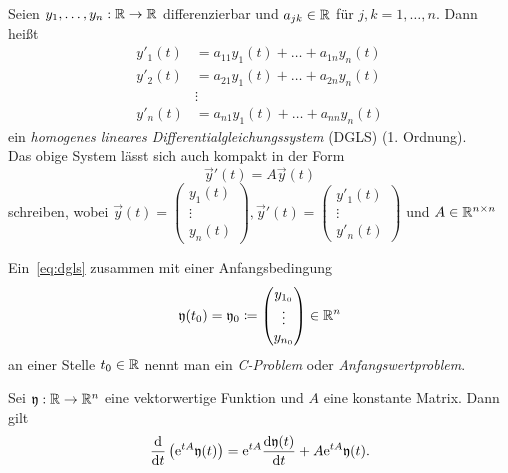 \begin{definition}
    Seien $y_1,\dots,y_n: \mathbb{R} \to \mathbb{R}$ differenzierbar und $a_{jk} \in \mathbb{R}$ für $j,k = 1,\dots,n$.
    Dann heißt
    \begin{equation*}
        \begin{aligned}
            y'_1(t) &= a_{11} y_1(t) + \dots + a_{1n} y_n(t)\\
            y'_2(t) &= a_{21} y_1(t) + \dots + a_{2n} y_n(t)\\
            &\vdots\\
            y'_n(t) &= a_{n1} y_1(t) + \dots + a_{nn} y_n(t)
        \end{aligned}
    \end{equation*}
    ein \emph{homogenes lineares Differentialgleichungssystem} (DGLS) (1. Ordnung).\\
    Das obige System lässt sich auch kompakt in der Form
    \begin{equation}\tag{DGLS}\label{eq:dgls}
        \vec{y}'(t) = A \vec{y}(t)
    \end{equation}
    schreiben, wobei $\vec{y}(t) = \begin{pmatrix} y_1(t)\\ \vdots\\ y_n(t) \end{pmatrix}, \vec{y}'(t) = \begin{pmatrix} y'_1(t)\\ \vdots\\ y'_n(t) \end{pmatrix}$
    und $A \in \mathbb{R}^{n \times n}$
\end{definition}

\begin{definition}
    Ein~\ref{eq:dgls} zusammen mit einer Anfangsbedingung
    \begin{equation*}
        \mathfrak{y}(t_0) = \mathfrak{y}_0 \coloneqq \begin{pmatrix} y_{1_0}\\ \vdots\\ y_{n_0} \end{pmatrix} \in \mathbb{R}^n
    \end{equation*}
    an einer Stelle $t_0 \in \mathbb{R}$ nennt man ein \emph{C-Problem} oder \emph{Anfangswertproblem}.
\end{definition}

\begin{lemma}\label{thm:matrixexp-derivative}
    Sei $\mathfrak{y}: \mathbb{R} \to \mathbb{R}^{n}$ eine vektorwertige Funktion und $A$ eine konstante Matrix.
    Dann gilt
    \begin{equation*}
        \frac{\mathrm{d} }{\mathrm{d} t} \left( \mathrm{e}^{t A} \mathfrak{y}(t) \right) = \mathrm{e}^{t A} \frac{\mathrm{d} \mathfrak{y}(t)}{\mathrm{d} t} + A \mathrm{e}^{t A} \mathfrak{y}(t).
    \end{equation*}
\end{lemma}

